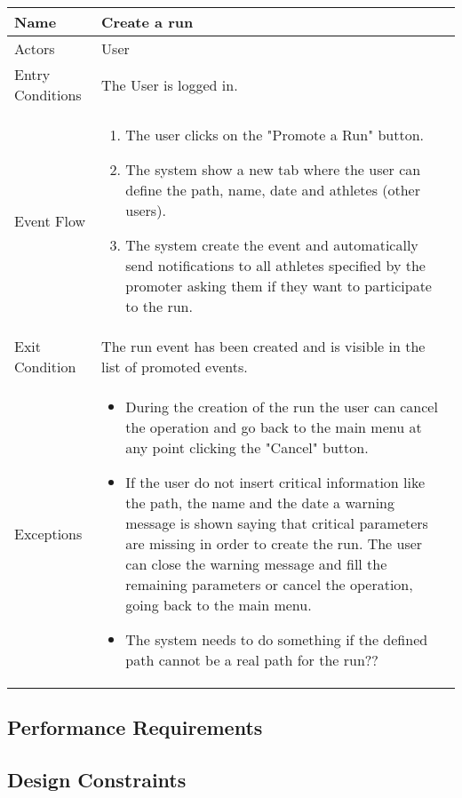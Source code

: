 \begin{table}[h]
\begin{tabular}{|l|l|}
\hline
Name             & Create a run \\ \hline
Actors           & User  \\ \hline
Entry Conditions & The User is logged in.    \\ \hline
Event Flow       & \parbox{.45\textwidth}{\begin{enumerate}
            \item The user clicks on the "Promote a Run" button.
            \item The system show a new tab where the user can define the path, name, date and athletes (other users).
            \item The system create the event and automatically send notifications to all athletes specified by the promoter asking them if they want to participate to the run.
        \end{enumerate}}\\ \hline
Exit Condition   & The run event has been created and is visible in the list of promoted events.\\ \hline
Exceptions       & \parbox{.45\textwidth}  
{\begin{itemize}
\item During the creation of the run the user can cancel the operation and go back to the main menu at any point clicking the "Cancel" button.
\item If the user do not insert critical information like the path, the name and the date a warning message is shown saying that critical parameters are missing in order to create the run. The user can close the warning message and fill the remaining parameters or cancel the operation, going back to the main menu.
\item The system needs to do something if the defined path cannot be a real path for the run??
\end{itemize}}\\ \hline
\end{tabular}
\end{table}


\subsection{Performance Requirements}

\subsection{Design Constraints}
